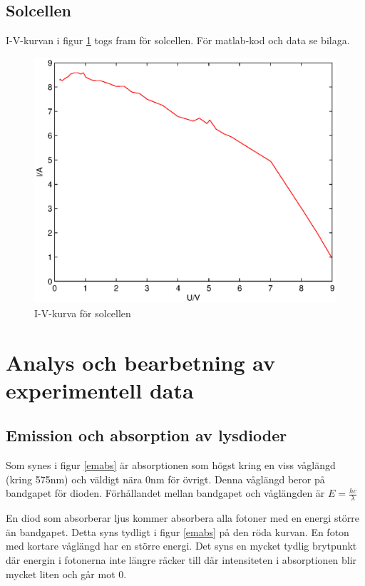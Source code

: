 \documentclass[a4paper]{article}
\begin{document}
\subsection{Solcellen}
I-V-kurvan i figur \ref{solcelliv} togs fram för solcellen. För matlab-kod och data se bilaga.
\begin{figure}[H]
	\centering
	\includegraphics[scale=.7]{solcell.eps}
	\caption{I-V-kurva för solcellen}
	\label{solcelliv}
\end{figure}

\section{Analys och bearbetning av experimentell data}
\subsection{Emission och absorption av lysdioder}
Som synes i figur \ref{emabs} är absorptionen som högst kring en viss våglängd (kring 575nm) och väldigt nära 0nm för övrigt. Denna våglängd beror på bandgapet för dioden. Förhållandet mellan bandgapet och våglängden är $E = \frac{hc}{\lambda}$

En diod som absorberar ljus kommer absorbera alla fotoner med en energi större än bandgapet. Detta syns tydligt i figur \ref{emabs} på den röda kurvan. En foton med kortare våglängd har en större energi. Det syns en mycket tydlig brytpunkt där energin i fotonerna inte längre räcker till där intensiteten i absorptionen blir mycket liten och går mot 0. 
\end{document}
